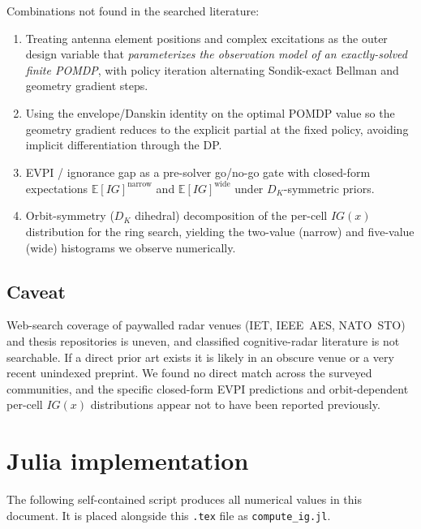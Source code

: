 \documentclass[11pt,a4paper]{article}
\newcommand{\E}{\mathbb{E}}
\begin{document}
Combinations not found in the searched literature:
\begin{enumerate}[nosep,leftmargin=2em]
  \item Treating antenna element positions and complex excitations as the outer design variable that \emph{parameterizes the observation model of an exactly-solved finite POMDP}, with policy iteration alternating Sondik-exact Bellman and geometry gradient steps.
  \item Using the envelope/Danskin identity on the optimal POMDP value so the geometry gradient reduces to the explicit partial at the fixed policy, avoiding implicit differentiation through the DP.
  \item EVPI / ignorance gap as a pre-solver go/no-go gate with closed-form expectations $\E[IG]^{\text{narrow}}$ and $\E[IG]^{\text{wide}}$ under $D_K$-symmetric priors.
  \item Orbit-symmetry ($D_K$ dihedral) decomposition of the per-cell $IG(x)$ distribution for the ring search, yielding the two-value (narrow) and five-value (wide) histograms we observe numerically.
\end{enumerate}

\subsection{Caveat}

Web-search coverage of paywalled radar venues (IET, IEEE~AES, NATO~STO) and thesis repositories is uneven, and classified cognitive-radar literature is not searchable.  If a direct prior art exists it is likely in an obscure venue or a very recent unindexed preprint.  We found no direct match across the surveyed communities, and the specific closed-form EVPI predictions and orbit-dependent per-cell $IG(x)$ distributions appear not to have been reported previously.

\appendix

\section{Julia implementation}
\label{app:code}
The following self-contained script produces all numerical values in this document.  It is placed alongside this \texttt{.tex} file as \texttt{compute\_ig.jl}.
\end{document}
